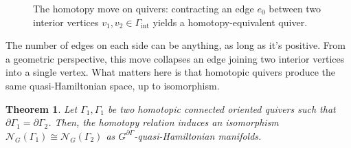 \documentclass[reqno]{amsart}
\theoremstyle{plain}
\newtheorem{Thm}{Theorem}[section]
\theoremstyle{definition}
\newcommand{\N}{\mathcal{N}}
\begin{document}
\begin{figure}[ht]
\caption{The homotopy move on quivers: contracting an edge $e_0$ between two interior vertices $v_1, v_2 \in \Gamma_{\mathrm{int}}$ yields a homotopy-equivalent quiver.}
\label{fig:homotopy}
\end{figure}

\noindent
The number of edges on each side can be anything, as long as it's positive. From a geometric perspective, this move collapses an edge joining two interior vertices into a single vertex. What matters here is that homotopic quivers produce the same quasi-Hamiltonian space, up to isomorphism.

\begin{Thm} \label{hom inv}
Let $\Gamma_1,\Gamma_1$ be two homotopic connected oriented quivers such that $\partial \Gamma_1 = \partial \Gamma_2$. Then, the homotopy relation induces an isomorphism $\N_G(\Gamma_1) \cong \N_G(\Gamma_2)$ as $G^{\partial \Gamma}$-quasi-Hamiltonian manifolds.  
\end{Thm}
\end{document}
